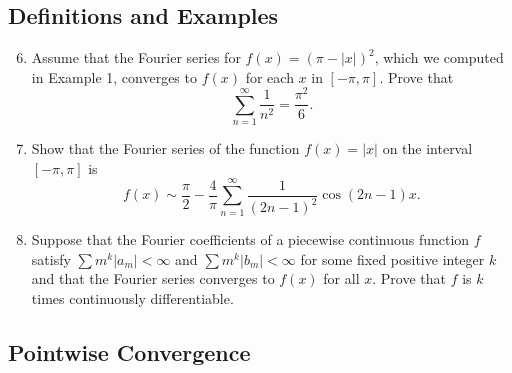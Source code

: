 \documentclass{article}
\begin{document}
\subsection{Definitions and Examples}

\begin{enumerate}
      \setcounter{enumi}{5}
      \item Assume that the Fourier series for $f(x)=(\pi-\lvert x\rvert)^2$,
            which we computed in Example 1, converges to $f(x)$ for each $x$ in
            $[-\pi,\pi]$. Prove that
            \[
                  \sum_{n=1}^\infty\frac{1}{n^2}=\frac{\pi^2}{6}.
            \]
            \setcounter{enumi}{7}
      \item Show that the Fourier series of the function $f(x)=\lvert x\rvert$ on
            the interval $[-\pi,\pi]$ is
            \[
                  f(x) \sim \frac{\pi}{2}-\frac{4}{\pi}
                  \sum_{n=1}^\infty\frac{1}{(2n-1)^2}\cos(2n-1)x.
            \]
            \setcounter{enumi}{9}
      \item Suppose that the Fourier coefficients of a piecewise continuous function
            $f$ satisfy $\sum m^k\lvert a_m\rvert<\infty$ and
            $\sum m^k\lvert b_m\rvert<\infty$ for some fixed positive integer $k$
            and that the Fourier series converges to $f(x)$ for all $x$. Prove that
            $f$ is $k$ times continuously differentiable.
\end{enumerate}

\subsection{Pointwise Convergence}
\end{document}
